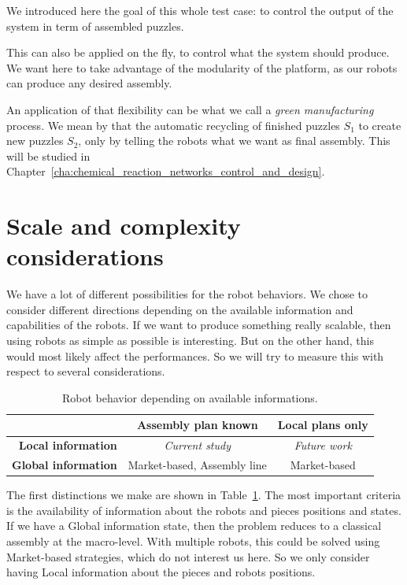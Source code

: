 We introduced here the goal of this whole test case: to control the output of the system in term of assembled puzzles.

This can also be applied on the fly, to control what the system should produce. We want here to take advantage of the modularity of the platform, as our robots can produce any desired assembly.

An application of that flexibility can be what we call a \textit{green manufacturing} process. We mean by that the automatic recycling of finished puzzles $S_1$ to create new puzzles $S_2$, only by telling the robots what we want as final assembly. This will be studied in Chapter~\ref{cha:chemical_reaction_networks_control_and_design}.


\section{Scale and complexity considerations} %
\label{sec:scale_and_complexity_considerations}

We have a lot of different possibilities for the robot behaviors. We chose to consider different directions depending on the available information and capabilities of the robots. If we want to produce something really scalable, then using robots as simple as possible is interesting. But on the other hand, this would most likely affect the performances. So we will try to measure this with respect to several considerations.

\begin{table}[h!]
	\begin{center}
	\begin{tabular}{r|c|c}
		& \textbf{Assembly plan known} & \textbf{Local plans only} \\
		\hline
		\textbf{Local information} & \textit{Current study} & \textit{Future work} \\
		\hline
		\textbf{Global information} & Market-based, Assembly line & Market-based
	\end{tabular}
	\end{center}
	\caption{Robot behavior depending on available informations.}
	\label{tab:robot_behavior}
\end{table}

The first distinctions we make are shown in Table~\ref{tab:robot_behavior}. The most important criteria is the availability of information about the robots and pieces positions and states. If we have a Global information state, then the problem reduces to a classical assembly at the macro-level. With multiple robots, this could be solved using Market-based strategies, which do not interest us here. So we only consider having Local information about the pieces and robots positions.

